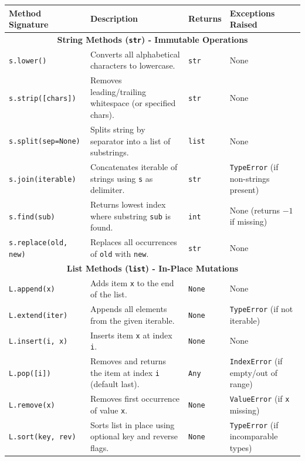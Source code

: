\begin{table}[htbp]
\centering
\small
\renewcommand{\arraystretch}{1.2}
\begin{tabularx}{\linewidth}{l>{\raggedright\arraybackslash}Xl>{\raggedright\arraybackslash}X}
\toprule
\textbf{Method Signature} & \textbf{Description} & \textbf{Returns} & \textbf{Exceptions Raised} \\
\midrule
\multicolumn{4}{c}{\cellcolor{pybg}\textbf{String Methods (\texttt{str}) - Immutable Operations}} \\
\midrule
\texttt{s.lower()} & Converts all alphabetical characters to lowercase. & \texttt{str} & None \\
\texttt{s.strip([chars])} & Removes leading/trailing whitespace (or specified chars). & \texttt{str} & None \\
\texttt{s.split(sep=None)} & Splits string by separator into a list of substrings. & \texttt{list} & None \\
\texttt{s.join(iterable)} & Concatenates iterable of strings using \texttt{s} as delimiter. & \texttt{str} & \texttt{TypeError} (if non-strings present) \\
\texttt{s.find(sub)} & Returns lowest index where substring \texttt{sub} is found. & \texttt{int} & None (returns $-1$ if missing) \\
\texttt{s.replace(old, new)} & Replaces all occurrences of \texttt{old} with \texttt{new}. & \texttt{str} & None \\
\midrule
\multicolumn{4}{c}{\cellcolor{pybg}\textbf{List Methods (\texttt{list}) - In-Place Mutations}} \\
\midrule
\texttt{L.append(x)} & Adds item \texttt{x} to the end of the list. & \texttt{None} & None \\
\texttt{L.extend(iter)} & Appends all elements from the given iterable. & \texttt{None} & \texttt{TypeError} (if not iterable) \\
\texttt{L.insert(i, x)} & Inserts item \texttt{x} at index \texttt{i}. & \texttt{None} & None \\
\texttt{L.pop([i])} & Removes and returns the item at index \texttt{i} (default last). & \texttt{Any} & \texttt{IndexError} (if empty/out of range) \\
\texttt{L.remove(x)} & Removes first occurrence of value \texttt{x}. & \texttt{None} & \texttt{ValueError} (if \texttt{x} missing) \\
\texttt{L.sort(key, rev)} & Sorts list in place using optional key and reverse flags. & \texttt{None} & \texttt{TypeError} (if incomparable types) \\

\end{tabularx}
\end{table}
